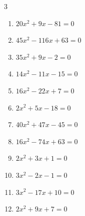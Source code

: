 \begin{multicols}{3}
\begin{enumerate}

  \item $20x^{2}+9x-81=0$


\columnbreak %

  \item $45x^{2}-116x+63=0$


  \item $35x^{2}+9x-2=0$


  \item $14x^{2}-11x-15=0$


  \item $16x^{2}-22x+7=0$


  \item $2x^{2}+5x-18=0$


  \item $40x^{2}+47x-45=0$


  \item $16x^{2}-74x+63=0$


  \item $2x^{2}+3x+1=0$


  \item $3x^{2}-2x-1=0$


  \item $3x^{2}-17x+10=0$


\columnbreak %

\resetques

  \item $2x^{2}+9x+7=0$


\end{enumerate}
\end{multicols}

